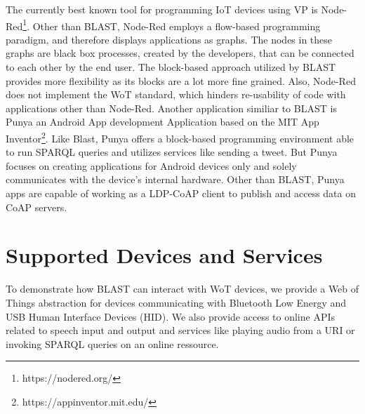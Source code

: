 \documentclass[runningheads]{llncs}
\begin{document}
The currently best known tool for programming IoT devices using VP is Node-Red\footnote{https://nodered.org/}. Other than BLAST, Node-Red employs a flow-based programming paradigm, and therefore displays applications as graphs. The nodes in these graphs are black box processes, created by the developers, that can be connected to each other by the end user. The block-based approach utilized by BLAST provides more flexibility as its blocks are a lot more fine grained. Also, Node-Red does not implement the WoT standard, which hinders re-usability of code with applications other than Node-Red. Another application similiar to BLAST is Punya\cite{patton2021punya} an Android App development Application based on the MIT App Inventor\footnote{https://appinventor.mit.edu/}. Like Blast, Punya offers a block-based programming environment able to run SPARQL queries and utilizes services like sending a tweet. But Punya focuses on creating applications for Android devices only and solely communicates with the device's internal hardware. Other than BLAST, Punya apps are capable of working as a LDP-CoAP client to publish and access data on CoAP servers.

\section{Supported Devices and Services}

To demonstrate how BLAST can interact with WoT devices, we provide a Web of Things abstraction for devices communicating with Bluetooth Low Energy and USB Human Interface Devices (HID).
We also provide access to online APIs related to speech input and output and services like playing audio from a URI or invoking SPARQL queries on an online ressource.
\end{document}
